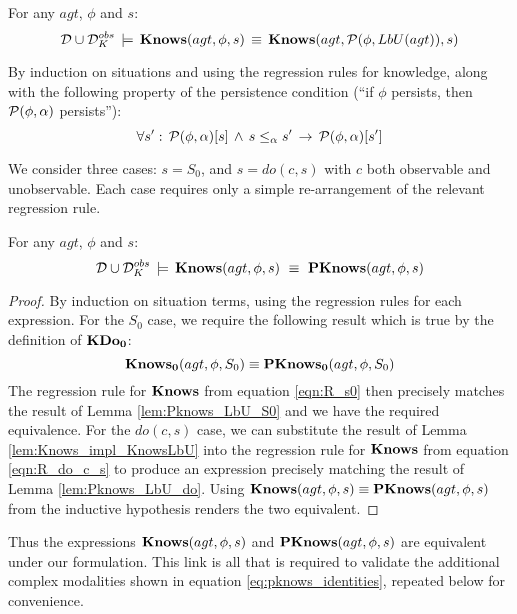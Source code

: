 \begin{lemma}
\label{lem:Knows_impl_KnowsLbU}For any $agt$, $\phi$ and $s$:\[
\mathcal{D}\cup\mathcal{D}_{K}^{obs}\,\models\,\mathbf{Knows}(agt,\phi,s)\,\equiv\,\mathbf{Knows}(agt,\mathcal{P}(\phi,LbU(agt)),s)\]

\end{lemma}
\begin{proofsketch}
By induction on situations and using the regression rules for knowledge,
along with the following property of the persistence condition ({}``if
$\phi$ persists, then $\mathcal{P}(\phi,\alpha)$ persists''):\[
\forall s':\,\mathcal{P}(\phi,\alpha)[s]\,\wedge\, s\leq_{\alpha}s'\,\rightarrow\,\mathcal{P}(\phi,\alpha)[s']\]


We consider three cases: $s=S_{0}$, and $s=do(c,s)$ with $c$ both
observable and unobservable. Each case requires only a simple re-arrangement
of the relevant regression rule. 
\end{proofsketch}
\begin{thm}
For any $agt$, $\phi$ and $s$:\[
\mathcal{D}\cup\mathcal{D}_{K}^{obs}\,\models\,\mathbf{Knows}(agt,\phi,s)\,\,\equiv\,\,\mathbf{PKnows}(agt,\phi,s)\]

\end{thm}
\begin{proof}
By induction on situation terms, using the regression rules for each
expression. For the $S_{0}$ case, we require the following result
which is true by the definition of $\mathbf{KDo_{0}}$:\[
\mathbf{Knows_{0}}(agt,\phi,S_{0})\equiv\mathbf{PKnows_{0}}(agt,\phi,S_{0})\]
 The regression rule for $\mathbf{Knows}$ from equation \eqref{eqn:R_s0}
then precisely matches the result of Lemma \ref{lem:Pknows_LbU_S0}
and we have the required equivalence. For the $do(c,s)$ case, we
can substitute the result of Lemma \ref{lem:Knows_impl_KnowsLbU}
into the regression rule for $\mathbf{Knows}$ from equation \eqref{eqn:R_do_c_s}
to produce an expression precisely matching the result of Lemma \ref{lem:Pknows_LbU_do}.
Using $\mathbf{Knows}(agt,\phi,s)\equiv\mathbf{PKnows}(agt,\phi,s)$ from the inductive
hypothesis renders the two equivalent. 
\end{proof}
Thus the expressions $\mathbf{Knows}(agt,\phi,s)$ and $\mathbf{PKnows}(agt,\phi,s)$
are equivalent under our formulation. This link is all that is required
to validate the additional complex modalities shown in equation \eqref{eq:pknows_identities},
repeated below for convenience.

